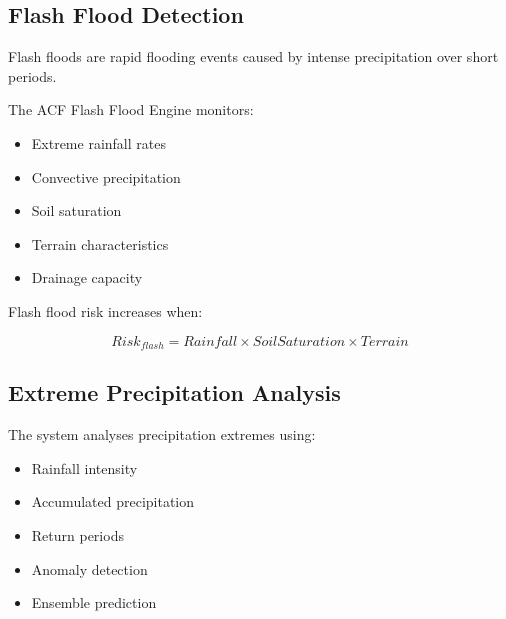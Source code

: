 
\subsection{Flash Flood Detection}

Flash floods are rapid flooding events caused by intense precipitation
over short periods.

The ACF Flash Flood Engine monitors:

\begin{itemize}

\item Extreme rainfall rates

\item Convective precipitation

\item Soil saturation

\item Terrain characteristics

\item Drainage capacity

\end{itemize}


Flash flood risk increases when:

\[
Risk_{flash}
=
Rainfall
\times
SoilSaturation
\times
Terrain
\]



\subsection{Extreme Precipitation Analysis}

The system analyses precipitation extremes using:

\begin{itemize}

\item Rainfall intensity

\item Accumulated precipitation

\item Return periods

\item Anomaly detection

\item Ensemble prediction

\end{itemize}


